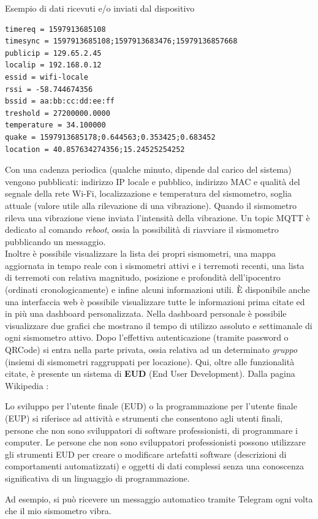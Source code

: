 \documentclass[a4paper,10pt]{memoir}
\begin{document}
\begin{center}
Esempio di dati ricevuti e/o inviati dal dispositivo
\end{center}
\begin{lstlisting}[numbers=none]
timereq = 1597913685108
timesync = 1597913685108;1597913683476;15979136857668
publicip = 129.65.2.45
localip = 192.168.0.12
essid = wifi-locale
rssi = -58.744674356
bssid = aa:bb:cc:dd:ee:ff
treshold = 27200000.0000
temperature = 34.100000
quake = 1597913685178;0.644563;0.353425;0.683452
location = 40.857634274356;15.24525254252
\end{lstlisting}
Con una cadenza periodica (qualche minuto, dipende dal carico del sistema) vengono pubblicati: indirizzo IP locale e pubblico, indirizzo MAC e qualità del segnale della rete Wi-Fi, localizzazione e temperatura del sismometro, soglia attuale (valore utile alla rilevazione di una vibrazione).
Quando il sismometro rileva una vibrazione viene inviata l'intensità della vibrazione.
Un topic MQTT è dedicato al comando \textit{reboot}, ossia la possibilità di riavviare il sismometro pubblicando un messaggio.\\
Inoltre è possibile visualizzare la lista dei propri sismometri, una mappa aggiornata in tempo reale con i sismometri attivi e i terremoti recenti, una lista di terremoti con relativa magnitudo, posizione e profondità dell'ipocentro (ordinati cronologicamente) e infine alcuni informazioni utili.
È disponibile anche una interfaccia web è possibile visualizzare tutte le informazioni prima citate ed in più una dashboard personalizzata.
Nella dashboard personale è possibile visualizzare due grafici che mostrano il tempo di utilizzo assoluto e settimanale di ogni sismometro attivo.
Dopo l'effettiva autenticazione (tramite password o QRCode) si entra nella parte privata, ossia relativa ad un determinato \textit{gruppo} (insiemi di sismometri raggruppati per locazione).
Qui, oltre alle funzionalità citate, è presente un sistema di \textbf{EUD} (End User Development).
Dalla pagina Wikipedia \cite{wikieud}:
\begin{quoting}[font=itshape, begintext={``}, endtext={``}]
Lo sviluppo per l'utente finale (EUD) o la programmazione per l'utente finale (EUP) si riferisce ad attività e strumenti che consentono agli utenti finali, persone che non sono sviluppatori di software professionisti, di programmare i computer. Le persone che non sono sviluppatori professionisti possono utilizzare gli strumenti EUD per creare o modificare artefatti software (descrizioni di comportamenti automatizzati) e oggetti di dati complessi senza una conoscenza significativa di un linguaggio di programmazione.
\end{quoting}
Ad esempio, si può ricevere un messaggio automatico tramite Telegram ogni volta che il mio sismometro vibra.
\end{document}
